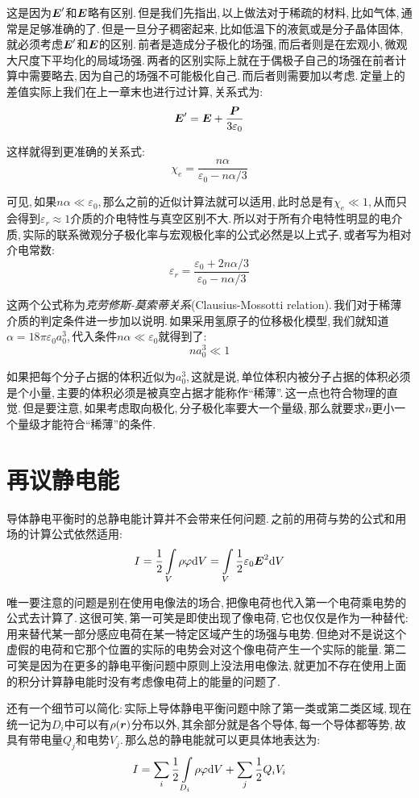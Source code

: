 这是因为$\boldsymbol{E}'$和$\boldsymbol{E}$略有区别.\,但是我们先指出,\,以上做法对于稀疏的材料,\,比如气体,\,通常是足够准确的了.\,但是一旦分子稠密起来,\,比如低温下的液氦或是分子晶体固体,\,就必须考虑$\boldsymbol{E}'$和$\boldsymbol{E}$的区别.\,前者是造成分子极化的场强,\,而后者则是在宏观小,\,微观大尺度下平均化的局域场强.\,两者的区别实际上就在于偶极子自己的场强在前者计算中需要略去,\,因为自己的场强不可能极化自己.\,而后者则需要加以考虑.\,定量上的差值实际上我们在上一章末也进行过计算,\,关系式为:
\[\boldsymbol{E}'=\boldsymbol{E}+\frac{\boldsymbol{P}}{3\varepsilon_0}\]

这样就得到更准确的关系式:
\[\chi_e=\frac{n\alpha}{\varepsilon_0-n\alpha/3}\]

可见,\,如果$n\alpha\ll \varepsilon_0$,\,那么之前的近似计算法就可以适用,\,此时总是有$\chi_e\ll 1$,\,从而只会得到$\varepsilon_r\approx 1$介质的介电特性与真空区别不大.\,所以对于所有介电特性明显的电介质,\,实际的联系微观分子极化率与宏观极化率的公式必然是以上式子,\,或者写为相对介电常数:
\[\varepsilon_r=\frac{\varepsilon_0+2n\alpha/3}{\varepsilon_0-n\alpha/3}\]

这两个公式称为\emph{克劳修斯-莫索蒂关系}(Clausius-Mossotti relation).\,我们对于稀薄介质的判定条件进一步加以说明.\,如果采用氢原子的位移极化模型,\,我们就知道$\alpha =18\pi \varepsilon_0 a_0^3$,\,代入条件$n\alpha\ll \varepsilon_0$就得到了:
\[na_0^3\ll 1\]

如果把每个分子占据的体积近似为$a_0^3$,\,这就是说,\,单位体积内被分子占据的体积必须是个小量,\,主要的体积必须是被真空占据才能称作``稀薄''.\,这一点也符合物理的直觉.\,但是要注意,\,如果考虑取向极化,\,分子极化率要大一个量级,\,那么就要求$n$更小一个量级才能符合``稀薄''的条件.

\section{再议静电能}

导体静电平衡时的总静电能计算并不会带来任何问题.\,之前的用荷与势的公式和用场的计算公式依然适用:
\[I=\frac{1}{2}\int\limits_{V}\rho \varphi \textrm{d} V=\int\limits_{V}\frac{1}{2}\varepsilon_0\boldsymbol{E}^2\textrm{d} V\]

唯一要注意的问题是别在使用电像法的场合,\,把像电荷也代入第一个电荷乘电势的公式去计算了.\,这很可笑,\,第一可笑是即使出现了像电荷,\,它也仅仅是作为一种替代:\,用来替代某一部分感应电荷在某一特定区域产生的场强与电势.\,但绝对不是说这个虚假的电荷和它那个位置的实际的电势会对这个像电荷产生一个实际的能量.\,第二可笑是因为在更多的静电平衡问题中原则上没法用电像法,\,就更加不存在使用上面的积分计算静电能时没有考虑像电荷上的能量的问题了.

还有一个细节可以简化:\,实际上导体静电平衡问题中除了第一类或第二类区域,\,现在统一记为$D_i$中可以有$\rho(\boldsymbol{r})$分布以外,\,其余部分就是各个导体,\,每一个导体都等势,\,故具有带电量$Q_j$和电势$V_j$.\,那么总的静电能就可以更具体地表达为:
\[I=\sum_i \frac{1}{2}\int\limits_{D_i}\rho \varphi \textrm{d} V+\sum_j \frac{1}{2}Q_iV_i\]


